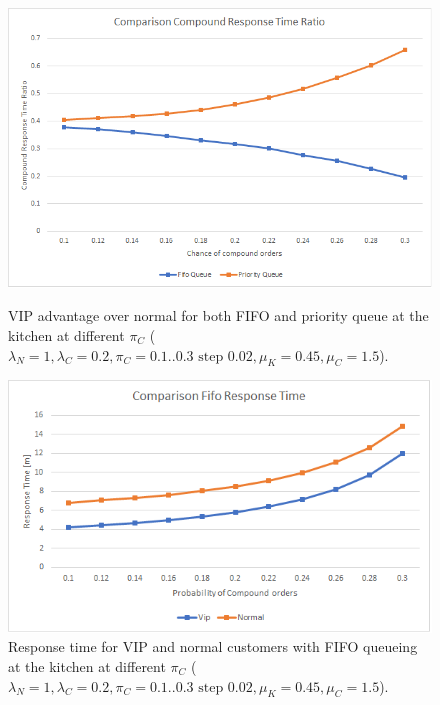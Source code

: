 \begin{figure}[h!]
    \centering
    \begin{minipage}{0.48\textwidth}
      \includegraphics[width=\textwidth]{figs/comparisonQueue.png}
      \caption{VIP advantage over normal for both FIFO and priority queue at the kitchen at different $\pi_C$ ($\lambda_N=1,\lambda_C=0.2,\pi_C={{0.1..0.3 \text{ step } 0.02}}, \mu_K=0.45, \mu_C=1.5$).}
      \label{fig:comp_kitc}
    \end{minipage}\hspace{0.03\textwidth}
    \begin{minipage}{0.48\textwidth}
      \includegraphics[width=\textwidth]{figs/comparisonFifoKitchen.png}
      \caption{Response time for VIP and normal customers with FIFO queueing at the kitchen at different $\pi_C$ ($\lambda_N=1,\lambda_C=0.2,\pi_C={{0.1..0.3 \text{ step } 0.02}}, \mu_K=0.45, \mu_C=1.5$).}
      \label{fig:fifokitchen-constant}
    \end{minipage}
\end{figure}


